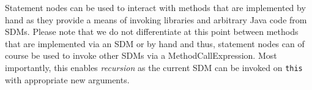 \begin{itemize}
\vspace{0.5cm}

\begin{figure}[htbp]
   \centering
      \caption{}
\end{figure}
\FloatBarrier

\end{itemize}

Statement nodes can be used to interact with methods that are implemented by hand as they provide a means of invoking libraries and arbitrary Java code from
SDMs. Please note that we do not differentiate at this point between methods that are implemented via an SDM or by hand and thus, statement nodes can of course
be used to invoke other SDMs via a MethodCallExpression. Most importantly, this enables \emph{recursion} as the current SDM can be invoked on \texttt{this} with
appropriate new arguments.

\newpage

